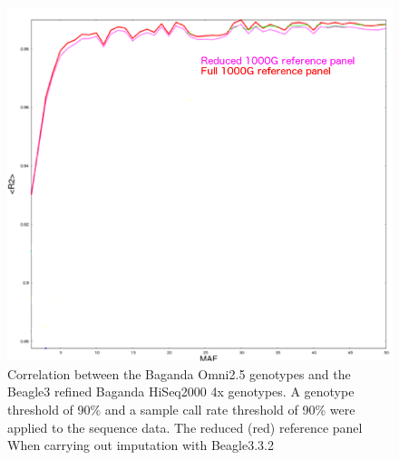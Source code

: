 \begin{figure}
\centering
\includegraphics{Chapter2/fig/imp_accu_beagle}
\caption{Correlation between the Baganda Omni2.5 genotypes and the Beagle3 refined Baganda HiSeq2000 4x genotypes. A genotype threshold of 90\% and a sample call rate threshold of 90\% were applied to the sequence data. The reduced (red) reference panel When carrying out imputation with Beagle3.3.2 }
\label{fig:imp_accu_beagle}
\end{figure}
